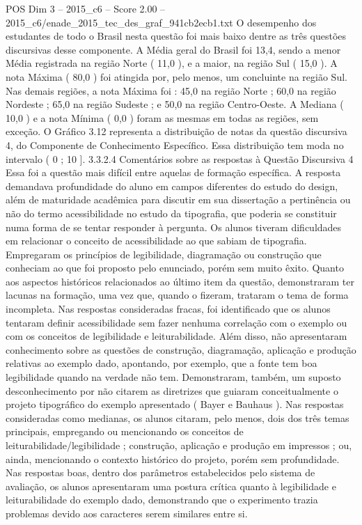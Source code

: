 \begin{textsample}{POS Dim 3 – 2015\_c6 – Score 2.00 – 2015\_c6/enade\_2015\_tec\_des\_graf\_941cb2ecb1.txt}
O desempenho dos estudantes de todo o Brasil nesta questão foi mais baixo dentre as três questões discursivas desse componente.
A Média geral do Brasil foi 13,4, sendo a menor Média registrada na região Norte ( 11,0 ), e a maior, na região Sul ( 15,0 ).
A nota Máxima ( 80,0 ) foi atingida por, pelo menos, um concluinte na região Sul.
Nas demais regiões, a nota Máxima foi : 45,0 na região Norte ; 60,0 na região Nordeste ; 65,0 na região Sudeste ; e 50,0 na região Centro-Oeste.
A Mediana ( 10,0 ) e a nota Mínima ( 0,0 ) foram as mesmas em todas as regiões, sem exceção.
O Gráfico 3.12 representa a distribuição de notas da questão discursiva 4, do Componente de Conhecimento Específico.
Essa distribuição tem moda no intervalo ( 0 ; 10 ]. 3.3.2.4 Comentários sobre as respostas à Questão Discursiva 4 Essa foi a questão mais difícil entre aquelas de formação específica.
A resposta demandava profundidade do aluno em campos diferentes do estudo do design, além de maturidade acadêmica para discutir em sua dissertação a pertinência ou não do termo acessibilidade no estudo da tipografia, que poderia se constituir numa forma de se tentar responder à pergunta.
Os alunos tiveram dificuldades em relacionar o conceito de acessibilidade ao que sabiam de tipografia.
Empregaram os princípios de legibilidade, diagramação ou construção que conheciam ao que foi proposto pelo enunciado, porém sem muito êxito.
Quanto aos aspectos históricos relacionados ao último item da questão, demonstraram ter lacunas na formação, uma vez que, quando o fizeram, trataram o tema de forma incompleta.
Nas respostas consideradas fracas, foi identificado que os alunos tentaram definir acessibilidade sem fazer nenhuma correlação com o exemplo ou com os conceitos de legibilidade e leiturabilidade.
Além disso, não apresentaram conhecimento sobre as questões de construção, diagramação, aplicação e produção relativas ao exemplo dado, apontando, por exemplo, que a fonte tem boa legibilidade quando na verdade não tem.
Demonstraram, também, um suposto desconhecimento por não citarem as diretrizes que guiaram conceitualmente o projeto tipográfico do exemplo apresentado ( Bayer e Bauhaus ).
Nas respostas consideradas como medianas, os alunos citaram, pelo menos, dois dos três temas principais, empregando ou mencionando os conceitos de leiturabilidade/legibilidade ; construção, aplicação e produção em impressos ; ou, ainda, mencionando o contexto histórico do projeto, porém sem profundidade.
Nas respostas boas, dentro dos parâmetros estabelecidos pelo sistema de avaliação, os alunos apresentaram uma postura crítica quanto à legibilidade e leiturabilidade do exemplo dado, demonstrando que o experimento trazia problemas devido aos caracteres serem similares entre si.

\end{textsample}
